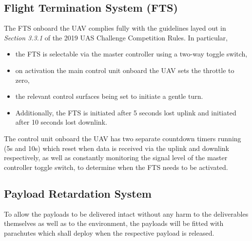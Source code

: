\subsection{Flight Termination System (FTS)}
The FTS onboard the UAV complies fully with the guidelines layed out in \textit{Section 3.3.1} of the 2019 UAS Challenge Competition Rules. In particular,
\begin{itemize}
\item the FTS is selectable via the master controller using a two-way toggle switch,
\item on activation the main control unit onboard the UAV sets the throttle to zero,
\item the relevant control surfaces being set to initiate a gentle turn.
\item Additionally, the FTS is initiated after 5 seconds lost uplink and initiated after 10 seconds lost downlink.
\end{itemize}
The control unit onboard the UAV has two separate countdown timers running (5s and 10s) which reset when data is received via the uplink and downlink respectively, as well as constantly monitoring the signal level of the master controller toggle switch, to determine when the FTS needs to be activated.

\subsection{Payload Retardation System}
To allow the payloads to be delivered intact without any harm to the deliverables themselves as well as to the environment, the payloads will be fitted with parachutes which shall deploy when the respective payload is released.
